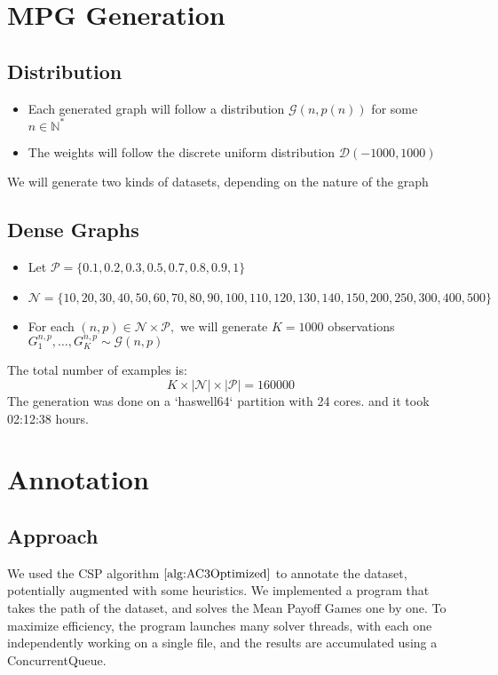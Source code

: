 \section{MPG Generation}
\subsection{Distribution}
\begin{itemize}
	\item Each generated graph will follow a distribution $\mathcal{G}(n,p(n))$  for some $n\in\mathbb{N}^*$
	\item The weights will follow the discrete uniform distribution $\mathcal{D}(-1000,1000)$

\end{itemize}

We will generate two kinds of datasets, depending on the nature of the graph

\subsection{Dense Graphs}
\begin{itemize}
	\item Let $\mathcal{P}=\{0.1,0.2,0.3,0.5,0.7,0.8,0.9,1\}$
	\item $\mathcal{N}=\{10,20,30,40,50,60,70,80,90,100,110,120,130,140,150,200,250,300,400,500\}$
	\item For each $(n,p)\in \mathcal{N}\times \mathcal{P},$ we will generate $K=1000$ observations $G^{n,p}_1,\dots,G^{n,p}_{K} \sim \mathcal{G}(n,p)$ 
\end{itemize} 

The total number of examples is:
$$
K\times\lvert \mathcal{N} \rvert \times \lvert \mathcal{P}\rvert=160000
$$
The generation was done on a `haswell64` partition with 24 cores. and it took 02:12:38 hours.

\section{Annotation}
\subsection{Approach}
We used the CSP algorithm $\ref{alg:AC3Optimized}$ to annotate the dataset, potentially augmented with some heuristics. 
\newline We implemented a program that takes the path of the dataset, and solves the Mean Payoff Games one by one.
\newline To maximize efficiency, the program launches many solver threads, with each one independently working on a single file, and the results are accumulated using a ConcurrentQueue.
